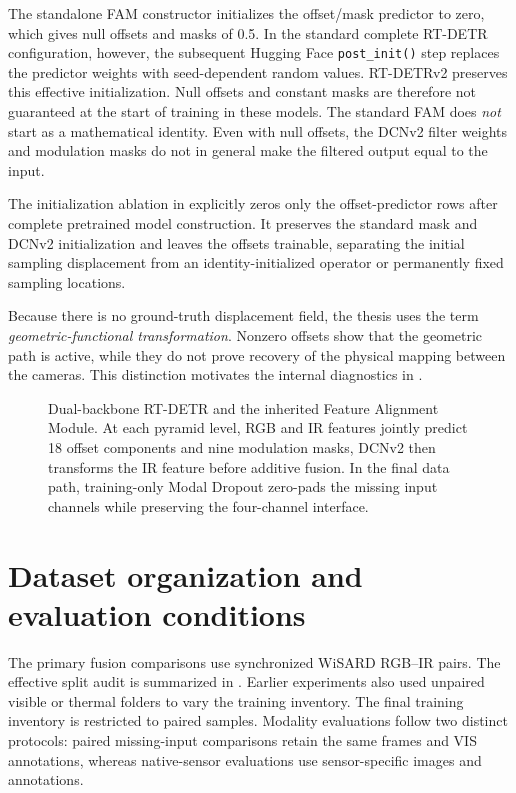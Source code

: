 The standalone FAM constructor initializes the offset/mask predictor to zero,
which gives null offsets and masks of 0.5. In the standard complete RT-DETR
configuration, however, the subsequent Hugging Face \texttt{post\_init()}
step replaces the predictor weights with seed-dependent random values.
RT-DETRv2 preserves this effective initialization. Null offsets and constant
masks are therefore not guaranteed at the start of training in these models.
The standard FAM does \emph{not} start as a mathematical identity. Even with
null offsets, the DCNv2 filter weights and modulation masks do not in general
make the filtered output equal to the input.

The initialization ablation in  explicitly zeros
only the offset-predictor rows after complete pretrained model construction.
It preserves the standard mask and DCNv2 initialization and leaves the offsets
trainable, separating the initial sampling displacement from an
identity-initialized operator or permanently fixed sampling locations.

Because there is no ground-truth displacement field, the thesis uses the term
\emph{geometric-functional transformation}. Nonzero offsets show that the
geometric path is active, while they do not prove recovery of the physical mapping
between the cameras. This distinction motivates the internal diagnostics in
.

\begin{figure}[H]
  \centering
  \caption{Dual-backbone RT-DETR and the inherited Feature Alignment Module.
  At each pyramid level, RGB and IR features jointly predict 18 offset
  components and nine modulation masks, DCNv2 then transforms the IR feature
  before additive fusion. In the final data path, training-only Modal Dropout
  zero-pads the missing input channels while preserving the four-channel
  interface.}
  \label{fig:fam-architecture}
\end{figure}

\section{Dataset organization and evaluation conditions}

The primary fusion comparisons use synchronized WiSARD RGB--IR pairs. The
effective split audit is summarized in . Earlier
experiments also used unpaired visible or thermal folders to vary the training
inventory. The final training inventory is restricted to paired samples.
Modality evaluations follow two distinct protocols: paired missing-input
comparisons retain the same frames and VIS annotations, whereas native-sensor
evaluations use sensor-specific images and annotations.

